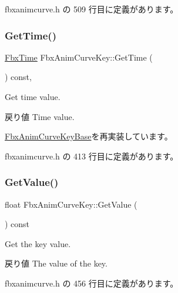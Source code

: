  fbxanimcurve.\+h の 509 行目に定義があります。

\mbox{\label{class_fbx_anim_curve_key_aae0882b53b31502cb30ea35de028837f}} 
\subsubsection{\texorpdfstring{Get\+Time()}{GetTime()}}
{\footnotesize\ttfamily \hyperlink{class_fbx_time}{Fbx\+Time} Fbx\+Anim\+Curve\+Key\+::\+Get\+Time (\begin{DoxyParamCaption}{ }\end{DoxyParamCaption}) const\hspace{0.3cm}{\ttfamily [inline]}, {\ttfamily [virtual]}}

Get time value. \begin{DoxyReturn}{戻り値}
Time value. 
\end{DoxyReturn}


\hyperlink{class_fbx_anim_curve_key_base_a3eebfd7bd2101f759269373a6c9343a2}{Fbx\+Anim\+Curve\+Key\+Base}を再実装しています。



 fbxanimcurve.\+h の 413 行目に定義があります。

\mbox{\label{class_fbx_anim_curve_key_a7d66374255e912386ab894a5e2945ff5}} 
\subsubsection{\texorpdfstring{Get\+Value()}{GetValue()}}
{\footnotesize\ttfamily float Fbx\+Anim\+Curve\+Key\+::\+Get\+Value (\begin{DoxyParamCaption}{ }\end{DoxyParamCaption}) const\hspace{0.3cm}{\ttfamily [inline]}}

Get the key value. \begin{DoxyReturn}{戻り値}
The value of the key. 
\end{DoxyReturn}


 fbxanimcurve.\+h の 456 行目に定義があります。

